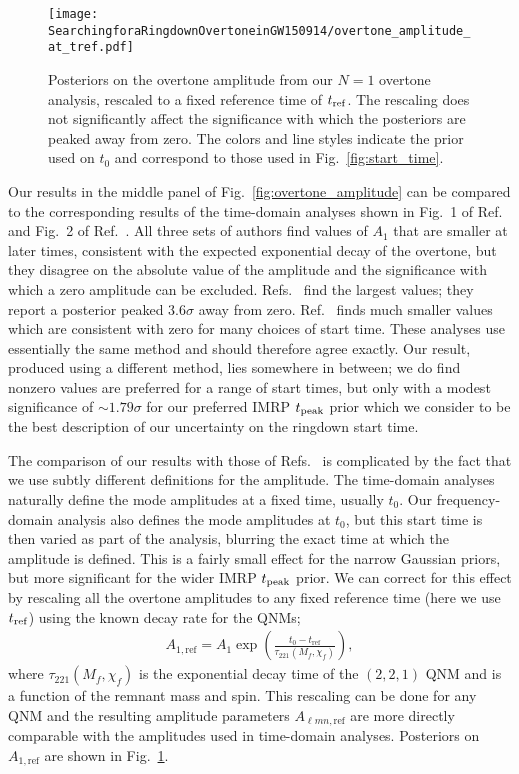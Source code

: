 \begin{figure}[t]
	\texttt{[image: SearchingforaRingdownOvertoneinGW150914/overtone\_amplitude\_at\_tref.pdf]}
	\caption[Posteriors on the GW150914 overtone amplitude, rescaled to a fixed reference time]{ 
		Posteriors on the overtone amplitude from our $N=1$ overtone analysis, rescaled to a fixed reference time of $t_{\rm ref}$.
		The rescaling does not significantly affect the significance with which the posteriors are peaked away from zero.
		The colors and line styles indicate the prior used on $t_0$ and correspond to those used in Fig.~\ref{fig:start_time}.
	}
	\label{fig:amp_at_tref}
\end{figure}

Our results in the middle panel of Fig.~\ref{fig:overtone_amplitude} can be compared to the corresponding results of the time-domain analyses shown in Fig.~1 of Ref.~\cite{Isi:2022mhy} and Fig.~2 of Ref.~\cite{Cotesta:2022pci}.
All three sets of authors find values of $A_1$ that are smaller at later times, consistent with the expected exponential decay of the overtone, but they disagree on the absolute value of the amplitude and the significance with which a zero amplitude can be excluded.
Refs.~\cite{Isi:2019aib, Isi:2022mhy} find the largest values; they report a posterior peaked $3.6\sigma$ away from zero.
Ref.~\cite{Cotesta:2022pci} finds much smaller values which are consistent with zero for many choices of start time.
These analyses use essentially the same method and should therefore agree exactly.
Our result, produced using a different method, lies somewhere in between; we do find nonzero values are preferred for a range of start times, but only with a modest significance of $\sim 1.79\sigma$ for our preferred IMRP $t_{\rm peak}$ prior which we consider to be the best description of our uncertainty on the ringdown start time.

The comparison of our results with those of Refs.~\cite{Isi:2019aib, Cotesta:2022pci, Isi:2022mhy} is complicated by the fact that we use subtly different definitions for the amplitude. 
The time-domain analyses naturally define the mode amplitudes at a fixed time, usually $t_0$.
Our frequency-domain analysis also defines the mode amplitudes at $t_0$, but this start time is then varied as part of the analysis, blurring the exact time at which the amplitude is defined.
This is a fairly small effect for the narrow Gaussian priors, but more significant for the wider IMRP $t_{\rm peak}$ prior.
We can correct for this effect by rescaling all the overtone amplitudes to any fixed reference time (here we use $t_{\rm ref}$) using the known decay rate for the QNMs;
\begin{align}
	A_{1,\mathrm{ref}} = A_1 \exp\left(\frac{t_0-t_{\mathrm{ref}}}{\tau_{221}(M_f,\chi_f)}\right),
\end{align}
where $\tau_{221}(M_f, \chi_f)$ is the exponential decay time of the $(2,2,1)$ QNM and is a function of the remnant mass and spin.
This rescaling can be done for any QNM and the resulting amplitude parameters $A_{\ell m n,\mathrm{ref}}$ are more directly comparable with the amplitudes used in time-domain analyses.
Posteriors on $A_{1,\mathrm{ref}}$ are shown in  
Fig.~\ref{fig:amp_at_tref}.

